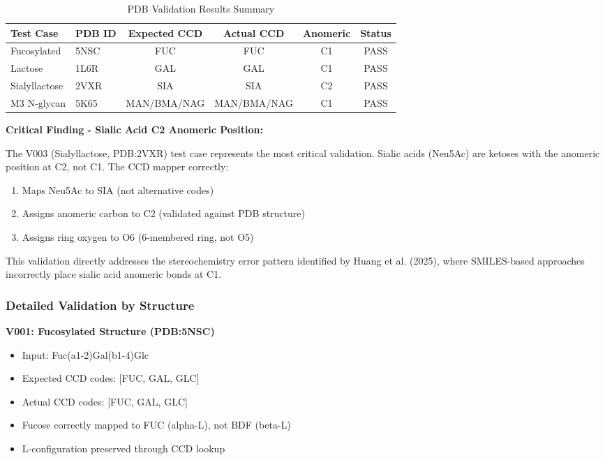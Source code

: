 \begin{table}[h]
\centering
\caption{PDB Validation Results Summary}
\begin{tabular}{llcccc}
\toprule
Test Case & PDB ID & Expected CCD & Actual CCD & Anomeric & Status \\
\midrule
Fucosylated & 5NSC & FUC & FUC & C1 & PASS \\
Lactose & 1L6R & GAL & GAL & C1 & PASS \\
Sialyllactose & 2VXR & SIA & SIA & C2 & PASS \\
M3 N-glycan & 5K65 & MAN/BMA/NAG & MAN/BMA/NAG & C1 & PASS \\
\bottomrule
\end{tabular}
\label{tab:pdb_results}
\end{table}

\textbf{Critical Finding - Sialic Acid C2 Anomeric Position:}

The V003 (Sialyllactose, PDB:2VXR) test case represents the most critical validation. Sialic acids (Neu5Ac) are ketoses with the anomeric position at C2, not C1. The CCD mapper correctly:
\begin{enumerate}
\item Maps Neu5Ac to SIA (not alternative codes)
\item Assigns anomeric carbon to C2 (validated against PDB structure)
\item Assigns ring oxygen to O6 (6-membered ring, not O5)
\end{enumerate}

This validation directly addresses the stereochemistry error pattern identified by Huang et al. (2025), where SMILES-based approaches incorrectly place sialic acid anomeric bonds at C1.

\subsubsection{Detailed Validation by Structure}

\textbf{V001: Fucosylated Structure (PDB:5NSC)}

\begin{itemize}
\item Input: Fuc(a1-2)Gal(b1-4)Glc
\item Expected CCD codes: [FUC, GAL, GLC]
\item Actual CCD codes: [FUC, GAL, GLC]
\item Fucose correctly mapped to FUC (alpha-L), not BDF (beta-L)
\item L-configuration preserved through CCD lookup
\end{itemize}

